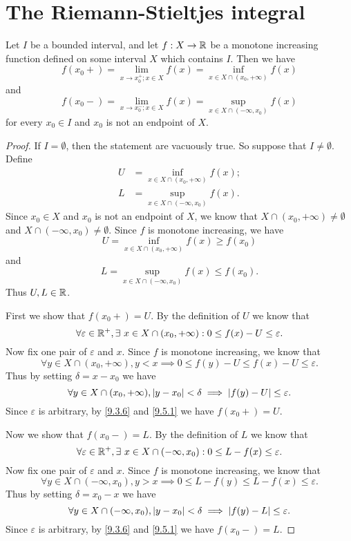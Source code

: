 \section{The Riemann-Stieltjes integral}\label{sec:11.8}

\begin{ac}\label{ac:11.8.1}
  Let \(I\) be a bounded interval, and let \(f : X \to \mathbb{R}\) be a monotone increasing function defined on some interval \(X\) which contains \(I\).
  Then we have
  \[
    f(x_0+) = \lim_{x \to x_0^+ ; x \in X} f(x) = \inf_{x \in X \cap (x_0, +\infty)} f(x)
  \]
  and
  \[
    f(x_0-) = \lim_{x \to x_0^- ; x \in X} f(x) = \sup_{x \in X \cap (-\infty, x_0)} f(x)
  \]
  for every \(x_0 \in I\) and \(x_0\) is not an endpoint of \(X\).
\end{ac}

\begin{proof}
  If \(I = \emptyset\), then the statement are vacuously true.
  So suppose that \(I \neq \emptyset\).
  Define
  \begin{align*}
    U & = \inf_{x \in X \cap (x_0, +\infty)} f(x); \\
    L & = \sup_{x \in X \cap (-\infty, x_0)} f(x).
  \end{align*}
  Since \(x_0 \in X\) and \(x_0\) is not an endpoint of \(X\), we know that \(X \cap (x_0, +\infty) \neq \emptyset\) and \(X \cap (-\infty, x_0) \neq \emptyset\).
  Since \(f\) is monotone increasing, we have
  \[
    U = \inf_{x \in X \cap (x_0, +\infty)} f(x) \geq f(x_0)
  \]
  and
  \[
    L = \sup_{x \in X \cap (-\infty, x_0)} f(x) \leq f(x_0).
  \]
  Thus \(U, L \in \mathbb{R}\).

  First we show that \(f(x_0+) = U\).
  By the definition of \(U\) we know that
  \[
    \forall \varepsilon \in \mathbb{R}^+, \exists\ x \in X \cap (x_0, +\infty) : 0 \leq f(x) - U \leq \varepsilon.
  \]
  Now fix one pair of \(\varepsilon\) and \(x\).
  Since \(f\) is monotone increasing, we know that
  \[
    \forall y \in X \cap (x_0, +\infty), y < x \implies 0 \leq f(y) - U \leq f(x) - U \leq \varepsilon.
  \]
  Thus by setting \(\delta = x - x_0\) we have
  \[
    \forall y \in X \cap (x_0, +\infty), \left\lvert y - x_0\right\rvert < \delta \implies \left\lvert f(y) - U\right\rvert \leq \varepsilon.
  \]
  Since \(\varepsilon\) is arbitrary, by \cref{9.3.6} and \cref{9.5.1} we have \(f(x_0+) = U\).

  Now we show that \(f(x_0-) = L\).
  By the definition of \(L\) we know that
  \[
    \forall \varepsilon \in \mathbb{R}^+, \exists\ x \in X \cap (-\infty, x_0) : 0 \leq L - f(x) \leq \varepsilon.
  \]
  Now fix one pair of \(\varepsilon\) and \(x\).
  Since \(f\) is monotone increasing, we know that
  \[
    \forall y \in X \cap (-\infty, x_0), y > x \implies 0 \leq L - f(y) \leq L - f(x) \leq \varepsilon.
  \]
  Thus by setting \(\delta = x_0 - x\) we have
  \[
    \forall y \in X \cap (-\infty, x_0), \left\lvert y - x_0\right\rvert < \delta \implies \left\lvert f(y) - L\right\rvert \leq \varepsilon.
  \]
  Since \(\varepsilon\) is arbitrary, by \cref{9.3.6} and \cref{9.5.1} we have \(f(x_0-) = L\).
\end{proof}

